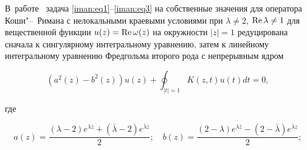 В~работе~\cite{iman:bib13} задача \eqref{iman:eq1}--\eqref{iman:eq3} на собственные значения для оператора Коши"--~Римана с нелокальными краевыми условиями при $\lambda  \ne 2$, $\mathop{\rm Re} \lambda  \ne 1 $ для вещественной функции $ u(z) = \mathop{\rm Re} \omega (z) $ на окружности $ |z| = 1 $ редуцирована сначала к сингулярному интегральному уравнению, затем к линейному интегральному уравнению Фредгольма второго рода с непрерывным ядром

\begin{equation}

\label{iman:eq6}

\left(a^2 (z) - b^2 (z) \right)   u(z) + \oint_{|t| = 1} K(z,t)   u(t)dt  = 0,

\end{equation}

где

$$

a(z) = \frac{(\lambda  - 2)   e^{\lambda \bar z}  + (\bar \lambda  - 2)   e^{\bar \lambda z} }{2};

\quad b(z) = \frac{(2 - \lambda )e^{\lambda \bar z}  - (2 - \bar \lambda )e^{\bar \lambda z}}{2};$$

